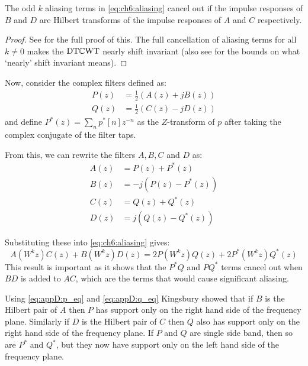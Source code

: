 \begin{theorem} \label{thm:ch6:shiftinv}
  The odd $k$ aliasing terms in \eqref{eq:ch6:aliasing} cancel out if the impulse
  responses of $B$ and $D$ are Hilbert transforms of the impulse responses of
  $A$ and $C$ respectively.
\end{theorem}

\begin{proof}
  See \cite[section 4]{kingsbury_complex_2001} for the full proof of
  this. The full cancellation of aliasing terms for all $k \neq 0$ makes the $\mathrm{DT}\mathbb{C}\mathrm{WT}$ 
  nearly shift invariant (also see \cite[section 7]{kingsbury_complex_2001} for the
  bounds on what `nearly' shift invariant means).  
\end{proof}

Now, consider the complex filters defined as:
\begin{align}
  P(z) &= \frac{1}{2}\left(A(z) + jB(z)\right) \label{eq:appD:p_eq}\\
  Q(z) &= \frac{1}{2}\left(C(z) - jD(z)\right) \label{eq:appD:q_eq}
\end{align}
and define $P^*(z) = \sum_{n} p^{*}[n] z^{-n}$ as the $Z$-transform of $p$
after taking the complex conjugate of the filter taps. 

From this, we can rewrite the filters $A, B, C$ and $D$ as:
\begin{align}
  A(z) &= P(z) + P^*(z) \\
  B(z) &= -j(P(z) - P^*(z)) \\
  C(z) &= Q(z) + Q^*(z) \\
  D(z) &= j(Q(z) - Q^*(z))
\end{align}

Substituting these into \eqref{eq:ch6:aliasing} gives:
\begin{equation}
  A(W^k z)C(z) + B(W^k z)D(z) = 2P(W^kz)Q(z) + 2P^*(W^kz)Q^*(z) \label{eq:ch6:complex_filts}
\end{equation}
This result is important as it shows that the $P^*Q$ and
$PQ^*$ terms cancel out when $BD$ is added to $AC$, which are the terms that
would cause significant aliasing.

Using \eqref{eq:appD:p_eq} and \eqref{eq:appD:q_eq} Kingsbury showed that if $B$ is the Hilbert pair
of $A$ then $P$ has support only on the right hand side of the frequency plane.
Similarly if $D$ is the Hilbert pair of $C$ then $Q$ also has support only on
the right hand side of the frequency plane. If $P$ and $Q$ are single side band,
then so are $P^*$ and $Q^*$, but they now have support only on the left hand
side of the frequency plane. 

